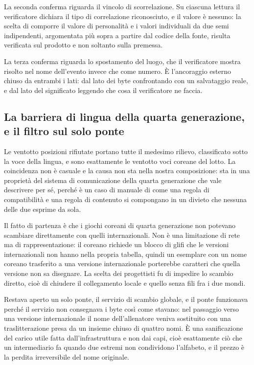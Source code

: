 La seconda conferma riguarda il vincolo di scorrelazione. Su ciascuna lettura il verificatore dichiara il tipo di correlazione riconosciuto, e il valore è nessuno: la scelta di comporre il valore di personalità e i valori individuali da due semi indipendenti, argomentata più sopra a partire dal codice della fonte, risulta verificata sul prodotto e non soltanto sulla premessa.

La terza conferma riguarda lo spostamento del luogo, che il verificatore mostra risolto nel nome dell'evento invece che come numero. È l'ancoraggio esterno chiuso da entrambi i lati: dal lato dei byte confrontando con un salvataggio reale, e dal lato del significato leggendo che cosa il verificatore ne faccia.

\subsection{La barriera di lingua della quarta generazione, e il filtro sul solo ponte}

Le ventotto posizioni rifiutate portano tutte il medesimo rilievo, classificato sotto la voce della lingua, e sono esattamente le ventotto voci coreane del lotto. La coincidenza non è casuale e la causa non sta nella nostra composizione: sta in una proprietà del sistema di comunicazione della quarta generazione che vale descrivere per sé, perché è un caso di manuale di come una regola di compatibilità e una regola di contenuto si compongano in un divieto che nessuna delle due esprime da sola.

Il fatto di partenza è che i giochi coreani di quarta generazione non potevano scambiare direttamente con quelli internazionali. Non è una limitazione di rete ma di rappresentazione: il coreano richiede un blocco di glifi che le versioni internazionali non hanno nella propria tabella, quindi un esemplare con un nome coreano trasferito a una versione internazionale porterebbe caratteri che quella versione non sa disegnare. La scelta dei progettisti fu di impedire lo scambio diretto, cioè di chiudere il collegamento locale e quello senza fili fra i due mondi.

Restava aperto un solo ponte, il servizio di scambio globale, e il ponte funzionava perché il servizio non consegnava i byte così come stavano: nel passaggio verso una versione internazionale il nome dell'allenatore veniva sostituito con una traslitterazione presa da un insieme chiuso di quattro nomi. È una sanificazione del carico utile fatta dall'infrastruttura e non dai capi, cioè esattamente ciò che un intermediario fa quando due estremi non condividono l'alfabeto, e il prezzo è la perdita irreversibile del nome originale.

